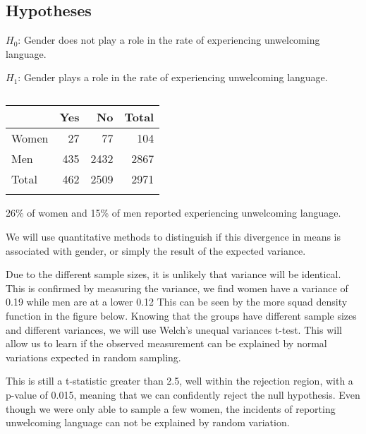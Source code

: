 \documentclass[journal,12pt,onecolumn,]{IEEEtran}
\begin{document}
\subsection{Hypotheses}

$H_0$: Gender does not play a role in the rate of experiencing unwelcoming language.

$H_1$: Gender plays a role in the rate of experiencing unwelcoming language.
\subsection{}

\begin{tabular}{lrrr}
    \toprule
          & Yes & No   & Total \\
    \midrule
    Women & 27  & 77   & 104   \\
    Men   & 435 & 2432 & 2867  \\
    Total & 462 & 2509 & 2971  \\
    \bottomrule                \\
\end{tabular}

26\% of women and 15\% of men reported experiencing unwelcoming language.

We will use quantitative methods to distinguish if this divergence in means is associated with gender, or simply the result of the expected variance.

Due to the different sample sizes, it is unlikely that variance will be identical.
This is confirmed by measuring the variance, we find women have a variance of 0.19 while men are at a lower 0.12
This can be seen by the more squad density function in the figure below.
Knowing that the groups have different sample sizes and different variances, we will use Welch's unequal variances t-test.
This will allow us to learn if the observed measurement can be explained by normal variations expected in random sampling.

This is still a t-statistic greater than 2.5, well within the rejection region, with a p-value of 0.015, meaning that we can confidently reject the null hypothesis.
Even though we were only able to sample a few women, the incidents of reporting unwelcoming language can not be explained by random variation.

\begin{figure}[h]
    \centering
    
\end{figure}
\end{document}
